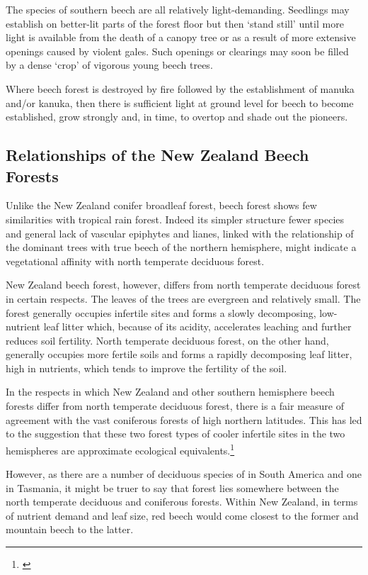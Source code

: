 The species of southern beech are all relatively light-demanding.
Seedlings may establish on better-lit parts of the forest floor but then `stand still' until more light is available from the death of a canopy tree or as a result of more extensive openings caused by violent gales.
Such openings or clearings may soon be filled by a dense `crop' of vigorous young beech trees.

Where beech forest is destroyed by fire followed by the establishment of manuka and/or kanuka, then there is sufficient light at ground level for beech to become established, grow strongly and, in time, to overtop and shade out the pioneers.

\subsection{Relationships of the New Zealand Beech Forests}

Unlike the New Zealand conifer broadleaf forest, beech forest shows few similarities with tropical rain forest.
Indeed its simpler structure fewer species and general lack of vascular epiphytes and lianes, linked with the relationship of the dominant trees with true beech of the northern hemisphere, might indicate a vegetational affinity with north temperate deciduous forest.

New Zealand beech forest, however, differs from north temperate deciduous forest in certain respects.
The leaves of the trees are evergreen and relatively small.
The forest generally occupies infertile sites and forms a slowly decomposing, low-nutrient leaf litter which, because of its acidity, accelerates leaching and further reduces soil fertility.
North temperate deciduous forest, on the other hand, generally occupies more fertile soils and forms a rapidly decomposing leaf litter, high in nutrients, which tends to improve the fertility of the soil.

In the respects in which New Zealand and other southern hemisphere beech forests differ from north temperate deciduous forest, there is a fair measure of agreement with the vast coniferous forests of high northern latitudes.
This has led to the suggestion that these two forest types of cooler infertile sites in the two hemispheres are approximate ecological equivalents.\footnote{\cite{dansereau1964six}}

However, as there are a number of deciduous species of  in South America and one in Tasmania, it might be truer to say that  forest lies somewhere between the north temperate deciduous and coniferous forests.
Within New Zealand, in terms of nutrient demand and leaf size, red beech would come closest to the former and mountain beech to the latter.

